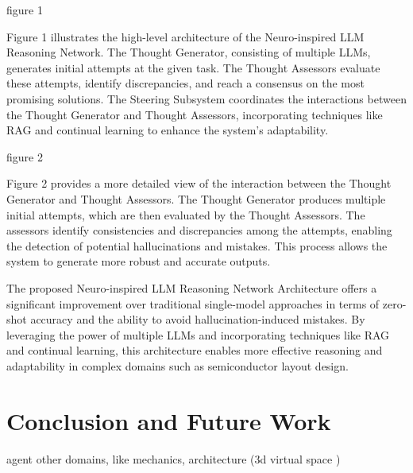 \documentclass{article}
\begin{document}
figure 1

Figure 1 illustrates the high-level architecture of the Neuro-inspired LLM Reasoning Network. The Thought Generator, consisting of multiple LLMs, generates initial attempts at the given task. The Thought Assessors evaluate these attempts, identify discrepancies, and reach a consensus on the most promising solutions. The Steering Subsystem coordinates the interactions between the Thought Generator and Thought Assessors, incorporating techniques like RAG and continual learning to enhance the system's adaptability.

figure 2

Figure 2 provides a more detailed view of the interaction between the Thought Generator and Thought Assessors. The Thought Generator produces multiple initial attempts, which are then evaluated by the Thought Assessors. The assessors identify consistencies and discrepancies among the attempts, enabling the detection of potential hallucinations and mistakes. This process allows the system to generate more robust and accurate outputs.

The proposed Neuro-inspired LLM Reasoning Network Architecture offers a significant improvement over traditional single-model approaches in terms of zero-shot accuracy and the ability to avoid hallucination-induced mistakes. By leveraging the power of multiple LLMs and incorporating techniques like RAG and continual learning, this architecture enables more effective reasoning and adaptability in complex domains such as semiconductor layout design.

\section{Conclusion and Future Work}
agent \cite{Ho2024-cd}
other domains, like mechanics, architecture (3d virtual space \cite{Sasazawa2024-wf})

\printbibliography %
\end{document}
